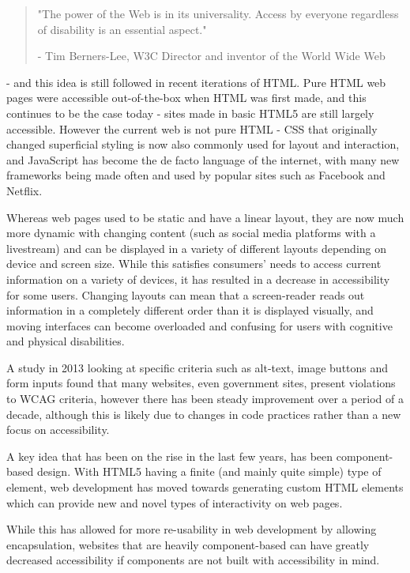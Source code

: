 \documentclass[ %
                    author={Aleena Baig},
                supervisor={Dr Simon Lock},
                    degree={BSc},
                     title={On Making Web Accessible Graphs},
                  subtitle={},
                      year={2019} ]{dissertation}
\begin{document}
\begin{quote}
\centering
"The power of the Web is in its universality. Access by everyone regardless of disability is an essential aspect."

- Tim Berners-Lee, W3C Director and inventor of the World Wide Web
\end{quote}
%
- and this idea is still followed in recent iterations of HTML. Pure HTML web pages were accessible out-of-the-box when HTML was first made, and this continues to be the case today - sites made in basic HTML5 are still largely accessible. However the current web is not pure HTML - CSS that originally changed superficial styling is now also commonly used for layout and interaction, and JavaScript has become the de facto language of the internet, with many new frameworks being made often and used by popular sites such as Facebook and Netflix.

Whereas web pages used to be static and have a linear layout, they are now much more dynamic with changing content (such as social media platforms with a livestream) and can be displayed in a variety of different layouts depending on device and screen size. While this satisfies consumers' needs to access current information on a variety of devices, it has resulted in a decrease in accessibility for some users. Changing layouts can mean that a screen-reader reads out information in a completely different order than it is displayed visually, and moving interfaces can become overloaded and confusing for users with cognitive and physical disabilities.

A study in 2013 looking at specific criteria such as alt-text, image buttons and form inputs found that many websites, even government sites, present violations to WCAG criteria, however there has been steady improvement over a period of a decade, although this is likely due to changes in code practices rather than a new focus on accessibility.\cite{progressaccessibility}

A key idea that has been on the rise in the last few years, has been component-based design. With HTML5 having a finite (and mainly quite simple) type of element, web development has moved towards generating custom HTML elements which can provide new and novel types of interactivity on web pages.

While this has allowed for more re-usability in web development by allowing encapsulation, websites that are heavily component-based can have greatly decreased accessibility if components are not built with accessibility in mind.
\end{document}
